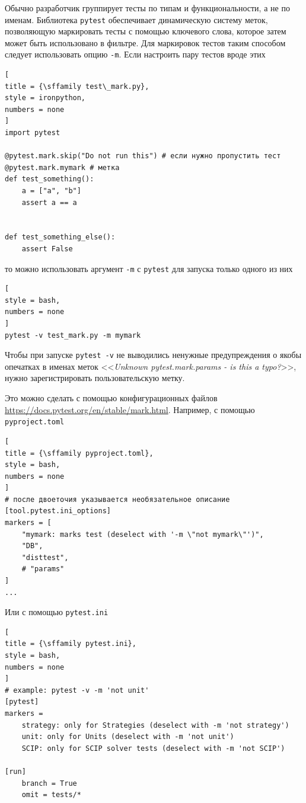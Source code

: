 \documentclass[%
	11pt,
	a4paper,
	utf8,
		]{article}
\begin{document}
Обычно разработчик группирует тесты по типам и функциональности, а не по именам. Библиотека \texttt{pytest} обеспечивает динамическую систему меток, позволяющую маркировать тесты с помощью ключевого слова, которое затем может быть использовано в фильтре. Для маркировок тестов таким способом следует использовать опцию \verb|-m|. Если настроить пару тестов вроде этих
\begin{lstlisting}[
title = {\sffamily test\_mark.py},
style = ironpython,
numbers = none	
]
import pytest

@pytest.mark.skip("Do not run this") # если нужно пропустить тест
@pytest.mark.mymark # метка
def test_something():
    a = ["a", "b"]
    assert a == a
    

def test_something_else():
    assert False
\end{lstlisting}
то можно использовать аргумент \verb|-m| с \texttt{pytest} для запуска только одного из них
\begin{lstlisting}[
style = bash,
numbers = none	
]
pytest -v test_mark.py -m mymark
\end{lstlisting}

Чтобы при запуске \texttt{pytest -v} не выводились ненужные предупреждения о якобы опечатках в именах меток <<\emph{Unknown pytest.mark.params - is this a typo?}>>, нужно зарегистрировать пользовательскую метку. 

Это можно сделать с помощью конфигурационных файлов \url{https://docs.pytest.org/en/stable/mark.html}. Например, с помощью \texttt{pyproject.toml}
\begin{lstlisting}[
title = {\sffamily pyproject.toml},
style = bash,
numbers = none	
]
# после двоеточия указывается необязательное описание
[tool.pytest.ini_options]
markers = [
    "mymark: marks test (deselect with '-m \"not mymark\"')",
    "DB",
    "disttest",
    # "params"
]
...
\end{lstlisting}

Или с помощью \texttt{pytest.ini}

\begin{lstlisting}[
title = {\sffamily pytest.ini},
style = bash,
numbers = none
]
# example: pytest -v -m 'not unit'
[pytest]
markers =
	strategy: only for Strategies (deselect with -m 'not strategy')
	unit: only for Units (deselect with -m 'not unit')
	SCIP: only for SCIP solver tests (deselect with -m 'not SCIP')

[run]
	branch = True
	omit = tests/*
\end{lstlisting}
\end{document}
